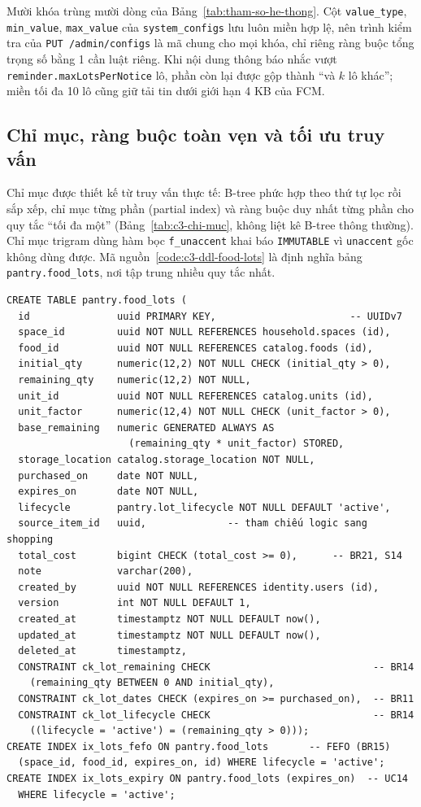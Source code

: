 Mười khóa trùng mười dòng của Bảng~\ref{tab:tham-so-he-thong}. Cột \texttt{value\_type}, \texttt{min\_value}, \texttt{max\_value} của \texttt{system\_configs} lưu luôn miền hợp lệ, nên trình kiểm tra của \texttt{PUT /admin/configs} là mã chung cho mọi khóa, chỉ riêng ràng buộc tổng trọng số bằng 1 cần luật riêng. Khi nội dung thông báo nhắc vượt \texttt{reminder.maxLotsPerNotice} lô, phần còn lại được gộp thành “và $k$ lô khác”; miền tối đa 10 lô cũng giữ tải tin dưới giới hạn 4 KB của FCM.

\subsection{Chỉ mục, ràng buộc toàn vẹn và tối ưu truy vấn}\label{ssec:chi-muc}

Chỉ mục được thiết kế từ truy vấn thực tế: B-tree phức hợp theo thứ tự lọc rồi sắp xếp, chỉ mục từng phần (partial index) và ràng buộc duy nhất từng phần cho quy tắc “tối đa một” (Bảng~\ref{tab:c3-chi-muc}, không liệt kê B-tree thông thường). Chỉ mục trigram dùng hàm bọc \texttt{f\_unaccent} khai báo \texttt{IMMUTABLE} vì \texttt{unaccent} gốc không dùng được. Mã nguồn~\ref{code:c3-ddl-food-lots} là định nghĩa bảng \texttt{pantry.food\_lots}, nơi tập trung nhiều quy tắc nhất.

\nopagebreak[4]
\begin{Verbatim}
CREATE TABLE pantry.food_lots (
  id               uuid PRIMARY KEY,                       -- UUIDv7
  space_id         uuid NOT NULL REFERENCES household.spaces (id),
  food_id          uuid NOT NULL REFERENCES catalog.foods (id),
  initial_qty      numeric(12,2) NOT NULL CHECK (initial_qty > 0),
  remaining_qty    numeric(12,2) NOT NULL,
  unit_id          uuid NOT NULL REFERENCES catalog.units (id),
  unit_factor      numeric(12,4) NOT NULL CHECK (unit_factor > 0),
  base_remaining   numeric GENERATED ALWAYS AS
                     (remaining_qty * unit_factor) STORED,
  storage_location catalog.storage_location NOT NULL,
  purchased_on     date NOT NULL,
  expires_on       date NOT NULL,
  lifecycle        pantry.lot_lifecycle NOT NULL DEFAULT 'active',
  source_item_id   uuid,              -- tham chiếu logic sang shopping
  total_cost       bigint CHECK (total_cost >= 0),      -- BR21, S14
  note             varchar(200),
  created_by       uuid NOT NULL REFERENCES identity.users (id),
  version          int NOT NULL DEFAULT 1,
  created_at       timestamptz NOT NULL DEFAULT now(),
  updated_at       timestamptz NOT NULL DEFAULT now(),
  deleted_at       timestamptz,
  CONSTRAINT ck_lot_remaining CHECK                            -- BR14
    (remaining_qty BETWEEN 0 AND initial_qty),
  CONSTRAINT ck_lot_dates CHECK (expires_on >= purchased_on),  -- BR11
  CONSTRAINT ck_lot_lifecycle CHECK                            -- BR14
    ((lifecycle = 'active') = (remaining_qty > 0)));
CREATE INDEX ix_lots_fefo ON pantry.food_lots       -- FEFO (BR15)
  (space_id, food_id, expires_on, id) WHERE lifecycle = 'active';
CREATE INDEX ix_lots_expiry ON pantry.food_lots (expires_on)  -- UC14
  WHERE lifecycle = 'active';
\end{Verbatim}

